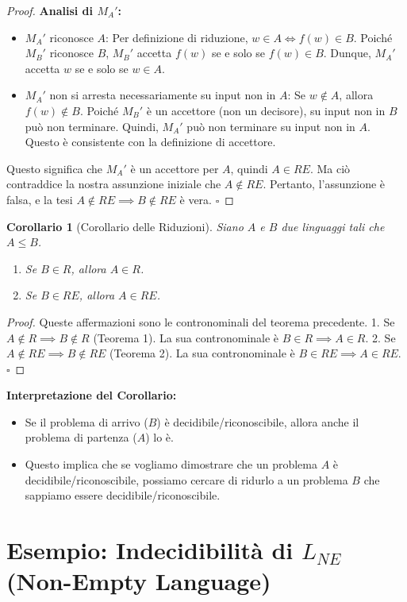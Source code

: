 \documentclass[a4paper]{article}
\newcommand{\blankS}{\ensuremath{\square}}
\newtheorem{corollary}[theorem]{Corollario} %
\begin{document}
\begin{proof}
\textbf{Analisi di $M_A'$:}
\begin{itemize}
    \item $M_A'$ riconosce $A$: Per definizione di riduzione, $w \in A \iff f(w) \in B$. Poiché $M_B'$ riconosce $B$, $M_B'$ accetta $f(w)$ se e solo se $f(w) \in B$. Dunque, $M_A'$ accetta $w$ se e solo se $w \in A$.
    \item $M_A'$ non si arresta necessariamente su input non in $A$: Se $w \notin A$, allora $f(w) \notin B$. Poiché $M_B'$ è un accettore (non un decisore), su input non in $B$ può non terminare. Quindi, $M_A'$ può non terminare su input non in $A$. Questo è consistente con la definizione di accettore.
\end{itemize}
Questo significa che $M_A'$ è un accettore per $A$, quindi $A \in RE$.
Ma ciò contraddice la nostra assunzione iniziale che $A \notin RE$.
Pertanto, l'assunzione è falsa, e la tesi $A \notin RE \implies B \notin RE$ è vera.
$\blankS$
\end{proof}

\begin{corollary}[Corollario delle Riduzioni]
Siano $A$ e $B$ due linguaggi tali che $A \le B$.
\begin{enumerate}
    \item Se $B \in R$, allora $A \in R$.
    \item Se $B \in RE$, allora $A \in RE$.
\end{enumerate}
\end{corollary}
\begin{proof}
Queste affermazioni sono le contronominali del teorema precedente.
1. Se $A \notin R \implies B \notin R$ (Teorema 1). La sua contronominale è $B \in R \implies A \in R$.
2. Se $A \notin RE \implies B \notin RE$ (Teorema 2). La sua contronominale è $B \in RE \implies A \in RE$.
$\blankS$
\end{proof}

\textbf{Interpretazione del Corollario:}
\begin{itemize}
    \item Se il problema di arrivo ($B$) è decidibile/riconoscibile, allora anche il problema di partenza ($A$) lo è.
    \item Questo implica che se vogliamo dimostrare che un problema $A$ è decidibile/riconoscibile, possiamo cercare di ridurlo a un problema $B$ che sappiamo essere decidibile/riconoscibile.
\end{itemize}

\section{Esempio: Indecidibilità di $L_{NE}$ (Non-Empty Language)}
\end{document}
